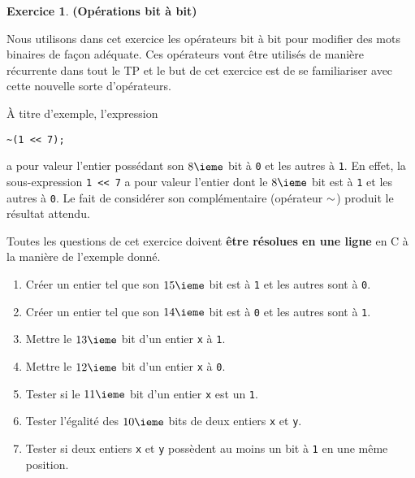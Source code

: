 \documentclass[12pt]{article}
\theoremstyle{definition}
\newtheorem{Exercice}{Exercice}
\begin{document}
\begin{Exercice} {\bf (Opérations bit à bit)}\smallskip
\label{ex:operations}

Nous utilisons dans cet exercice les opérateurs bit à bit pour
modifier des mots binaires de façon adéquate. Ces opérateurs vont être
utilisés de manière récurrente dans tout le TP et le but de cet exercice
est de se familiariser avec cette nouvelle sorte d'opérateurs. 
\smallskip

À titre d'exemple, l'expression
\begin{lstlisting}
~(1 << 7);
\end{lstlisting}
a pour valeur l'entier possédant son $8\ieme$ bit à {\tt 0} et les autres 
à {\tt 1}. En effet, la sous-expression {\tt 1 << 7} a pour valeur l'entier 
dont le $8\ieme$ bit est à {\tt 1} et les autres à {\tt 0}. Le fait 
de considérer son complémentaire (opérateur ${\tt \sim}$) produit 
le résultat attendu.
\smallskip

Toutes les questions de cet exercice doivent {\bf être résolues en une ligne} 
en {\sf C} à la manière de l'exemple donné.
\begin{enumerate}
    \item Créer un entier tel que son $15\ieme$ bit est à {\tt 1} et les
    autres sont à {\tt 0}.
    \smallskip

    \item Créer un entier tel que son $14\ieme$ bit est à {\tt 0} et les
    autres sont à {\tt 1}.
    \smallskip

    \item Mettre le $13\ieme$ bit d'un entier {\tt x} à {\tt 1}.
    \smallskip

    \item Mettre le $12\ieme$ bit d'un entier {\tt x} à {\tt 0}.
    \smallskip

    \item Tester si le $11\ieme$ bit d'un entier {\tt x} est un {\tt 1}.
    \smallskip

    \item Tester l'égalité des $10\ieme$ bits de deux entiers {\tt x} et
    {\tt y}.
    \smallskip

    \item Tester si deux entiers {\tt x} et {\tt y} possèdent au moins
    un bit à {\tt 1} en une même position.
\end{enumerate}
\end{Exercice}
\bigskip
\end{document}
